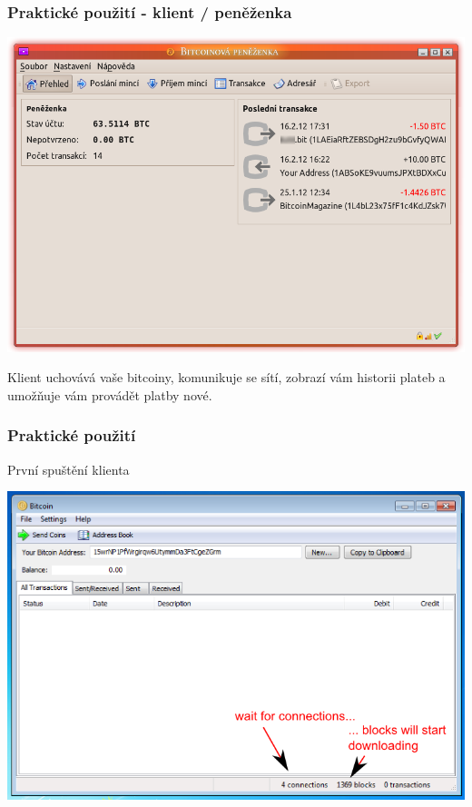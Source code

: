 \documentclass[xetex]{beamer}
\begin{document}
\begin{frame}
 \frametitle{Praktické použití - klient / peněženka}
	\includegraphics[scale=0.3]{images/klient.png}

	\smallskip

	Klient uchovává vaše bitcoiny, komunikuje se sítí, zobrazí vám historii plateb a umožňuje vám provádět platby nové.
\end{frame}

\begin{frame}
 \frametitle{Praktické použití}
	
	První spuštění klienta

	\includegraphics[scale=0.4]{images/first-time-run.png}
\end{frame}
\end{document}
